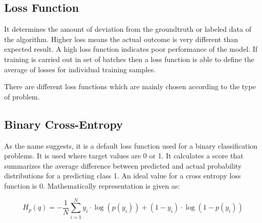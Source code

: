 \documentclass[11pt]{article}
\begin{document}

\subsection{Loss Function}
It determines the amount of deviation from the groundtruth or labeled data of the algorithm. Higher loss means the actual outcome is very different than expected result. A high loss function indicates poor performance of the model. If training is carried out in set of batches then a loss function is able to define the average of losses for individual training samples. 

There are different loss functions which are mainly chosen according to the type of problem. 

\subsection{Binary Cross-Entropy}
As the name suggests, it is a default loss function used for a binary classification problems. It is used where target values are 0 or 1. It calculates a score that summarizes the average difference between predicted and actual probability distributions for a predicting class 1. An ideal value for a cross entropy loss function is 0. Mathematically representation is given as:

\begin{equation}
H_{p}(q)=-\frac{1}{N} \sum_{i=1}^{N} y_{i} \cdot \log \left(p\left(y_{i}\right)\right)+\left(1-y_{i}\right) \cdot \log \left(1-p\left(y_{i}\right)\right)
\label{bce}
\end{equation}
\end{document}
